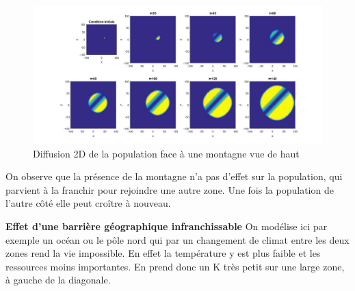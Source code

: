 \documentclass[a4paper,11pt]{article}
\begin{document}
\begin{figure}[H]
	\centering
	\includegraphics[width=0.7\linewidth]{SimulationKPP/Enviro/montagneVueHaut}
	\caption{Diffusion 2D de la population face à une montagne vue de haut}
	\label{MontagneBis}
\end{figure}



On observe que la présence de la montagne n'a pas d'effet sur la population, qui parvient à la franchir pour rejoindre une autre zone. Une fois la population de l'autre côté elle peut croître à nouveau.


\textbf{Effet d'une barrière géographique infranchissable}
On modélise ici par exemple un océan ou le pôle nord qui par un changement de climat entre les deux zones rend la vie impossible. En effet la température y est plus faible et les ressources moins importantes. En prend donc un K très petit sur une large zone, à gauche de la diagonale. 
\end{document}
